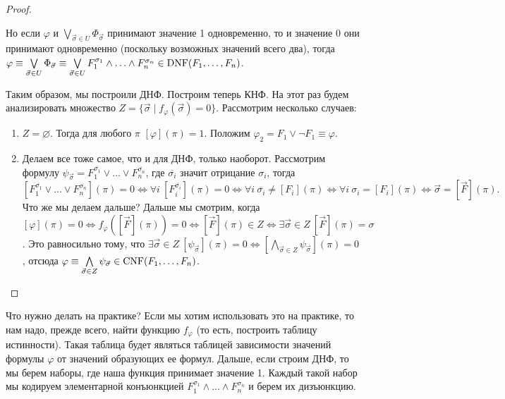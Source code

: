 \begin{proof}
\begin{enumerate}
        Но если $\varphi$ и $\bigvee\limits_{\vec{\sigma} \in U}\Phi_{\vec{\sigma}}$ принимают значение 1 одновременно, то и значение 0 они принимают одновременно (поскольку возможных значений всего два), тогда $\varphi \equiv \bigvee\limits_{\vec{\sigma} \in U}\Phi_{\vec{\sigma}} \equiv \bigvee\limits_{\vec{\sigma} \in U} F_{1}^{\sigma_{1}} \land \ldots \land F_{n}^{\sigma_{n}} \in \operatorname{DNF}(F_{1}, \ldots, F_{n})$.
    \end{enumerate}
    Таким образом, мы построили ДНФ.
    Построим теперь КНФ.
    На этот раз будем анализировать множество $Z = \{\vec{\sigma} \mid f_{\varphi}(\vec{\sigma}) = 0\}$.
    Рассмотрим несколько случаев:
    \begin{enumerate}
        \item $Z = \varnothing$.
        Тогда для любого $\pi$ $[\varphi](\pi) = 1$.
        Положим $\varphi_{2} = F_{1} \lor \neg F_{1} \equiv \varphi$.
        \item Делаем все тоже самое, что и для ДНФ, только наоборот.
        Рассмотрим формулу $\psi_{\vec{\sigma}} = F_{1}^{\overline{\sigma_{1}}} \lor \ldots \lor F_{n}^{\overline{\sigma_{n}}}$, где $\overline{\sigma_{i}}$ значит отрицание $\sigma_{i}$, тогда
        $$
            \left[F_{1}^{\overline{\sigma_{1}}} \lor \ldots \lor F_{n}^{\overline{\sigma_{n}}}\right](\pi) = 0 \iff \forall i~ [F_{i}^{\overline{\sigma_{i}}}](\pi) = 0 \iff \forall i~ \overline{\sigma_{i}} \neq [F_{i}](\pi) \iff \forall i~ \sigma_{i} = [F_{i}](\pi) \iff \vec{\sigma} = [\vec{F}](\pi).
        $$
        Что же мы делаем дальше?
        Дальше мы смотрим, когда $[\varphi](\pi) = 0 \iff f_{\varphi}([\vec{F}](\pi)) = 0 \iff [\vec{F}](\pi) \in Z \iff \exists\vec{\sigma} \in Z~ [\vec{F}](\pi) = \sigma$.
        Это равносильно тому, что $\exists \vec{\sigma} \in Z~[\psi_{\vec{\sigma}}](\pi) = 0 \iff [\bigwedge\limits_{\vec{\sigma} \in Z}\psi_{\vec{\sigma}}](\pi) = 0$, отсюда $\varphi \equiv \bigwedge\limits_{\vec{\sigma} \in Z}\psi_{\vec{\sigma}} \in \operatorname{CNF}(F_{1}, \ldots, F_{n})$.
    \end{enumerate}
\end{proof}

Что нужно делать на практике?
Если мы хотим использовать это на практике, то нам надо, прежде всего, найти функцию $f_{\varphi}$ (то есть, построить таблицу истинности).
Такая таблица будет являться таблицей зависимости значений формулы $\varphi$ от значений образующих ее формул.
Дальше, если строим ДНФ, то мы берем наборы, где наша функция принимает значение 1.
Каждый такой набор мы кодируем элементарной конъюнкцией $F_{1}^{\sigma_{1}} \land \ldots \land F_{n}^{\sigma_{n}}$ и берем их дизъюнкцию.

